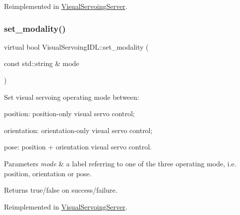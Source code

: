 Reimplemented in \hyperlink{classVisualServoingServer_a393d1a1d1a7a68fc2098a7c7e8724cc9}{Visual\+Servoing\+Server}.

\mbox{\label{classVisualServoingIDL_acf88e08e442c512452efe69f103f8f12}} 
\subsubsection{\texorpdfstring{set\+\_\+modality()}{set\_modality()}}
{\footnotesize\ttfamily virtual bool Visual\+Servoing\+I\+D\+L\+::set\+\_\+modality (\begin{DoxyParamCaption}\item[{const std\+::string \&}]{mode }\end{DoxyParamCaption})\hspace{0.3cm}{\ttfamily [virtual]}}



Set visual servoing operating mode between\+: 


\begin{DoxyEnumerate}
\item \textquotesingle{}position\textquotesingle{}\+: position-\/only visual servo control;
\item \textquotesingle{}orientation\textquotesingle{}\+: orientation-\/only visual servo control;
\item \textquotesingle{}pose\textquotesingle{}\+: position + orientation visual servo control. 
\begin{DoxyParams}{Parameters}
{\em mode} & a label referring to one of the three operating mode, i.\+e. \textquotesingle{}position\textquotesingle{}, \textquotesingle{}orientation\textquotesingle{} or \textquotesingle{}pose\textquotesingle{}. \\
\hline
\end{DoxyParams}
\begin{DoxyReturn}{Returns}
true/false on success/failure. 
\end{DoxyReturn}

\end{DoxyEnumerate}

Reimplemented in \hyperlink{classVisualServoingServer_a6d9ec4489caebf0a52b2e5ee149aeb6d}{Visual\+Servoing\+Server}.

\mbox{\label{classVisualServoingIDL_a63069a57bf0a190f0d76b5c0eba694fb}} 
